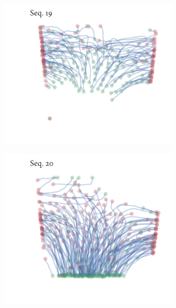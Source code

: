 \begin{figure}[h]
	\begin{subfigure}[t]{0.5\textwidth}
		\centering
		\includegraphics{sequence19.pdf}
	\end{subfigure}%
	\begin{subfigure}[t]{0.5\textwidth}
		\centering
		\includegraphics{sequence20.pdf}
	\end{subfigure}
	\begin{subfigure}[t]{0.5\textwidth}
		\centering

\end{subfigure}
\end{figure}
